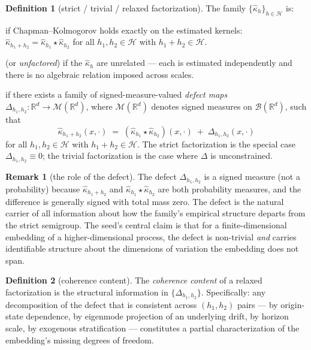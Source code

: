 \documentclass[11pt]{article}
\newcommand{\Rb}{\mathbb{R}}
\newcommand{\Hcal}{\mathcal{H}}
\newcommand{\Mcal}{\mathcal{M}}
\newcommand{\Bcal}{\mathcal{B}}
\newcommand{\defect}{\Delta}
\newcommand{\compose}{\star}
\theoremstyle{definition}
\newtheorem{definition}{Definition}
\newtheorem{remark}{Remark}
\theoremstyle{plain}
\begin{document}
\begin{definition}[strict / trivial / relaxed factorization]
\label{def:factorization}
The family $\{\hat\kappa_h\}_{h \in \Hcal}$ is:
\begin{description}[leftmargin=2em]
\item[(A) Strictly factored] if Chapman--Kolmogorov holds
exactly on the estimated kernels:
$\hat\kappa_{h_1 + h_2} = \hat\kappa_{h_1} \compose \hat\kappa_{h_2}$
for all $h_1, h_2 \in \Hcal$ with $h_1 + h_2 \in \Hcal$.

\item[(B) Trivially factored] (or \emph{unfactored}) if the
$\hat\kappa_h$ are unrelated --- each is estimated independently
and there is no algebraic relation imposed across scales.

\item[(C) Relaxedly factored] if there exists a family of
signed-measure-valued \emph{defect maps}
$\defect_{h_1, h_2} : \Rb^d \to \Mcal(\Rb^d)$, where $\Mcal(\Rb^d)$
denotes signed measures on $\Bcal(\Rb^d)$, such that
\begin{equation}
  \label{eq:relax}
  \hat\kappa_{h_1 + h_2}(x, \cdot) \;=\;
  (\hat\kappa_{h_1} \compose \hat\kappa_{h_2})(x, \cdot)
  \;+\; \defect_{h_1, h_2}(x, \cdot)
\end{equation}
for all $h_1, h_2 \in \Hcal$ with $h_1 + h_2 \in \Hcal$. The
strict factorization is the special case $\defect_{h_1, h_2} \equiv 0$;
the trivial factorization is the case where $\defect$ is
unconstrained.
\end{description}
\end{definition}

\begin{remark}[the role of the defect]
The defect $\defect_{h_1, h_2}$ is a signed measure (not a
probability) because $\hat\kappa_{h_1+h_2}$ and
$\hat\kappa_{h_1} \compose \hat\kappa_{h_2}$ are both probability
measures, and the difference is generally signed with total mass
zero. The defect is the natural carrier of all information about
how the family's empirical structure departs from the strict
semigroup. The seed's central claim is that for a finite-dimensional
embedding of a higher-dimensional process, the defect is non-trivial
\emph{and} carries identifiable structure about the dimensions of
variation the embedding does not span.
\end{remark}

\begin{definition}[coherence content]
\label{def:coherence}
The \emph{coherence content} of a relaxed factorization is the
structural information in $\{\defect_{h_1, h_2}\}$. Specifically:
any decomposition of the defect that is consistent across
$(h_1, h_2)$ pairs --- by origin-state dependence, by eigenmode
projection of an underlying drift, by horizon scale, by exogenous
stratification --- constitutes a partial characterization of the
embedding's missing degrees of freedom.
\end{definition}
\end{document}

